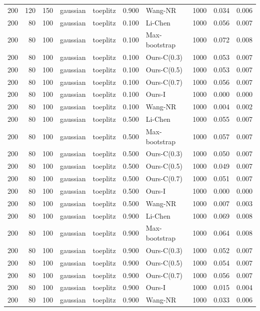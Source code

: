 \begin{tabular}{rrrllrlrrr}
200 & 120 & 150 & gaussian & toeplitz & 0.900 & Wang-NR & 1000 & 0.034 & 0.006 \\
200 & 80 & 100 & gaussian & toeplitz & 0.100 & Li-Chen & 1000 & 0.056 & 0.007 \\
200 & 80 & 100 & gaussian & toeplitz & 0.100 & Max-bootstrap & 1000 & 0.072 & 0.008 \\
200 & 80 & 100 & gaussian & toeplitz & 0.100 & Ours-C(0.3) & 1000 & 0.053 & 0.007 \\
200 & 80 & 100 & gaussian & toeplitz & 0.100 & Ours-C(0.5) & 1000 & 0.053 & 0.007 \\
200 & 80 & 100 & gaussian & toeplitz & 0.100 & Ours-C(0.7) & 1000 & 0.056 & 0.007 \\
200 & 80 & 100 & gaussian & toeplitz & 0.100 & Ours-I & 1000 & 0.000 & 0.000 \\
200 & 80 & 100 & gaussian & toeplitz & 0.100 & Wang-NR & 1000 & 0.004 & 0.002 \\
200 & 80 & 100 & gaussian & toeplitz & 0.500 & Li-Chen & 1000 & 0.055 & 0.007 \\
200 & 80 & 100 & gaussian & toeplitz & 0.500 & Max-bootstrap & 1000 & 0.057 & 0.007 \\
200 & 80 & 100 & gaussian & toeplitz & 0.500 & Ours-C(0.3) & 1000 & 0.050 & 0.007 \\
200 & 80 & 100 & gaussian & toeplitz & 0.500 & Ours-C(0.5) & 1000 & 0.049 & 0.007 \\
200 & 80 & 100 & gaussian & toeplitz & 0.500 & Ours-C(0.7) & 1000 & 0.051 & 0.007 \\
200 & 80 & 100 & gaussian & toeplitz & 0.500 & Ours-I & 1000 & 0.000 & 0.000 \\
200 & 80 & 100 & gaussian & toeplitz & 0.500 & Wang-NR & 1000 & 0.007 & 0.003 \\
200 & 80 & 100 & gaussian & toeplitz & 0.900 & Li-Chen & 1000 & 0.069 & 0.008 \\
200 & 80 & 100 & gaussian & toeplitz & 0.900 & Max-bootstrap & 1000 & 0.064 & 0.008 \\
200 & 80 & 100 & gaussian & toeplitz & 0.900 & Ours-C(0.3) & 1000 & 0.052 & 0.007 \\
200 & 80 & 100 & gaussian & toeplitz & 0.900 & Ours-C(0.5) & 1000 & 0.054 & 0.007 \\
200 & 80 & 100 & gaussian & toeplitz & 0.900 & Ours-C(0.7) & 1000 & 0.056 & 0.007 \\
200 & 80 & 100 & gaussian & toeplitz & 0.900 & Ours-I & 1000 & 0.015 & 0.004 \\
200 & 80 & 100 & gaussian & toeplitz & 0.900 & Wang-NR & 1000 & 0.033 & 0.006 \\

\end{tabular}
